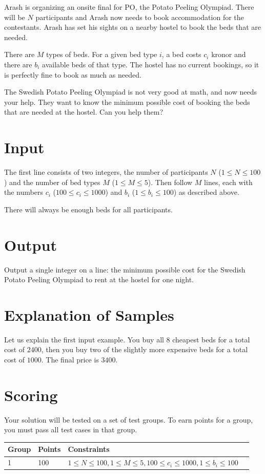 Arash is organizing an onsite final for PO, the Potato Peeling Olympiad. There will be
$N$ participants and Arash now needs to book accommodation for the contestants. Arash has set his sights
on a nearby hostel to book the beds that are needed.

There are $M$ types of beds. For a given bed type $i$, a bed
costs $c_i$ kronor and there are $b_i$ available beds of that type. The hostel has
no current bookings, so it is perfectly fine to book as much as
needed.

The Swedish Potato Peeling Olympiad is not very good at math, and
now needs your help. They want to know the minimum possible cost of booking
the beds that are needed at the hostel. Can you help them?

\section*{Input}
The first line consists of two integers, the number of participants $N$ ($1 \leq N \leq 100$)
and the number of bed types $M$ ($1 \leq M \leq 5$). Then follow $M$ lines, each
with the numbers $c_i$ ($100 \leq c_i \leq 1000$) and $b_i$ ($1 \leq b_i \leq 100$) as
described above.

There will always be enough beds for all participants.

\section*{Output}
Output a single integer on a line: the minimum possible cost for the Swedish Potato Peeling Olympiad to rent
at the hostel for one night.

\section*{Explanation of Samples}
Let us explain the first input example. You buy all $8$ cheapest
beds for a total cost of $2400$, then you buy two of the slightly more expensive
beds for a total cost of $1000$. The final price is $3400$.

\section*{Scoring}
Your solution will be tested on a set of test groups. To earn points for a group,
you must pass all test cases in that group.

\begin{tabular}{| l | l | l | l |}
\hline
Group & Points & Constraints \\ \hline
1     & 100         &  $1 \leq N \leq 100, 1 \leq M \leq 5, 100 \leq c_i \le 1000, 1 \leq b_i \leq 100$ \\ \hline
\end{tabular}
